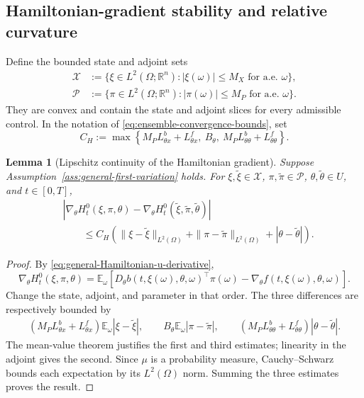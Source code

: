 \documentclass[11pt]{amsart}
\numberwithin{equation}{section} %
\newtheorem{lemma}{Lemma}[section]
\theoremstyle{remark}
\begin{document}
\subsection{Hamiltonian-gradient stability and relative curvature}
\label{subsec:ensemble-relative-smoothness}

Define the bounded state and adjoint sets
\[
\begin{aligned}
\mathcal X&:=\{\xi\in L^2(\Omega;\mathbb R^n):|\xi(\omega)|\le M_X
\text{ for a.e. }\omega\},\\
\mathcal P&:=\{\pi\in L^2(\Omega;\mathbb R^n):|\pi(\omega)|\le M_P
\text{ for a.e. }\omega\}.
\end{aligned}
\]
They are convex and contain the state and adjoint slices for every
admissible control. In the notation of
\eqref{eq:ensemble-convergence-bounds}, set
\begin{equation}
\label{eq:CH-general}
C_H:=\max\left\{
M_PL_{\theta x}^b+L_{\theta x}^f,\ B_\theta,\
M_PL_{\theta\theta}^b+L_{\theta\theta}^f\right\}.
\end{equation}

\begin{lemma}[Lipschitz continuity of the Hamiltonian gradient]
\label{lem:ensemble-Hamiltonian-gradient-Lipschitz}
Suppose Assumption~\ref{ass:general-first-variation} holds. For
$\xi,\widetilde\xi\in\mathcal X$, $\pi,\widetilde\pi\in\mathcal P$,
$\theta,\widetilde\theta\in U$, and $t\in[0,T]$,
\begin{align}
\label{eq:ensemble-Hamiltonian-gradient-Lipschitz}
&|\nabla_\theta H_t^0(\xi,\pi,\theta)
-\nabla_\theta H_t^0(\widetilde\xi,\widetilde\pi,\widetilde\theta)|\nonumber\\
&\qquad\le C_H\left(
\|\xi-\widetilde\xi\|_{L^2(\Omega)}
+\|\pi-\widetilde\pi\|_{L^2(\Omega)}+|\theta-\widetilde\theta|\right).
\end{align}
\end{lemma}

\begin{proof}
By \eqref{eq:general-Hamiltonian-u-derivative},
\[
\nabla_\theta H_t^0(\xi,\pi,\theta)=\mathbb E_\omega
\left[D_\theta b(t,\xi(\omega),\theta,\omega)^\top\pi(\omega)
-\nabla_\theta f(t,\xi(\omega),\theta,\omega)\right].
\]
Change the state, adjoint, and parameter in that order. The three
differences are respectively bounded by
\[
\begin{aligned}
(M_PL_{\theta x}^b+L_{\theta x}^f)
\mathbb E_\omega|\xi-\widetilde\xi|, \qquad B_\theta\mathbb E_\omega|\pi-\widetilde\pi|,\qquad (M_PL_{\theta\theta}^b+L_{\theta\theta}^f)
|\theta-\widetilde\theta|.
\end{aligned}
\]
The mean-value theorem justifies the first and third estimates;
linearity in the adjoint gives the second. Since $\mu$ is a probability
measure, Cauchy--Schwarz bounds each expectation by its $L^2(\Omega)$
norm. Summing the three estimates proves the result.
\end{proof}
\end{document}

